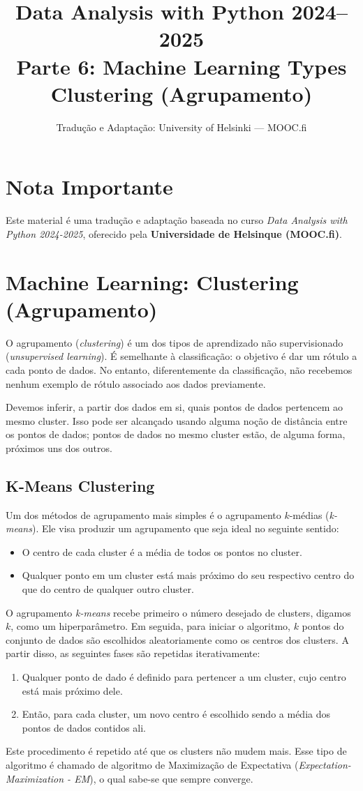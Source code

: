 \documentclass[11pt,a4paper]{article}
\title{\textbf{Data Analysis with Python 2024--2025}\\Parte 6: Machine Learning Types\\\large Clustering (Agrupamento)}
\author{Tradução e Adaptação: University of Helsinki --- MOOC.fi}
\date{}
\begin{document}
\maketitle

\section*{Nota Importante}
Este material é uma tradução e adaptação baseada no curso \textit{Data Analysis with Python 2024-2025}, oferecido pela \textbf{Universidade de Helsinque (MOOC.fi)}.

\tableofcontents
\newpage

\section{Machine Learning: Clustering (Agrupamento)}

O agrupamento (\emph{clustering}) é um dos tipos de aprendizado não supervisionado (\emph{unsupervised learning}). É semelhante à classificação: o objetivo é dar um rótulo a cada ponto de dados. No entanto, diferentemente da classificação, não recebemos nenhum exemplo de rótulo associado aos dados previamente. 

Devemos inferir, a partir dos dados em si, quais pontos de dados pertencem ao mesmo cluster. Isso pode ser alcançado usando alguma noção de distância entre os pontos de dados; pontos de dados no mesmo cluster estão, de alguma forma, próximos uns dos outros.

\subsection{K-Means Clustering}
Um dos métodos de agrupamento mais simples é o agrupamento $k$-médias (\emph{k-means}). Ele visa produzir um agrupamento que seja ideal no seguinte sentido:
\begin{itemize}
    \item O centro de cada cluster é a média de todos os pontos no cluster.
    \item Qualquer ponto em um cluster está mais próximo do seu respectivo centro do que do centro de qualquer outro cluster.
\end{itemize}

O agrupamento \emph{k-means} recebe primeiro o número desejado de clusters, digamos $k$, como um hiperparâmetro. Em seguida, para iniciar o algoritmo, $k$ pontos do conjunto de dados são escolhidos aleatoriamente como os centros dos clusters. A partir disso, as seguintes fases são repetidas iterativamente:
\begin{enumerate}
    \item Qualquer ponto de dado é definido para pertencer a um cluster, cujo centro está mais próximo dele.
    \item Então, para cada cluster, um novo centro é escolhido sendo a média dos pontos de dados contidos ali.
\end{enumerate}
Este procedimento é repetido até que os clusters não mudem mais. Esse tipo de algoritmo é chamado de algoritmo de Maximização de Expectativa (\emph{Expectation-Maximization - EM}), o qual sabe-se que sempre converge.
\end{document}
